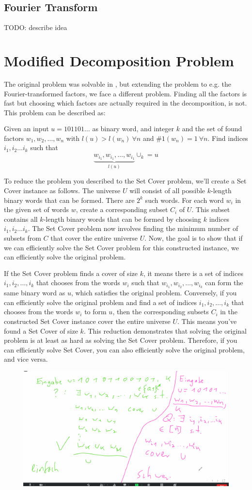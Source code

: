 \subsection{Fourier Transform}
TODO: describe idea

\section{Modified Decomposition Problem}
The original problem was solvable in \LogSpace, but extending the problem to e.g. the Fourier-transformed factors, we face a different problem. Finding all the factors is fast but choosing which factors are actually required in the decomposition, is not. This problem can be described as:

Given an input $u = 101101\dots$ as binary word, and integer $k$ and the set of found factors $w_1, w_2, \dots, w_n$ with $l(u) > l(w_n) ~\forall n$ and $\#1(w_n) = 1 ~\forall n$. Find indices $i_1, i_2 \dots i_k$ such that
\[
\underbrace{w_{i_1}, w_{i_1}, \dots, w_{i_1}}_{l(u)} \cup_k = u
\]

To reduce the problem you described to the Set Cover problem, we'll create a Set Cover instance as follows. The universe $U$ will consist of all possible $k$-length binary words that can be formed. There are $2^k$ such words.
For each word $w_i$ in the given set of words $w$, create a corresponding subset $C_i$ of $U$. This subset contains all $k$-length binary words that can be formed by choosing $k$ indices $i_1, i_2 \dots i_k$. The Set Cover problem now involves finding the minimum number of subsets from $C$ that cover the entire universe $U$. Now, the goal is to show that if we can efficiently solve the Set Cover problem for this constructed instance, we can efficiently solve the original problem.

If the Set Cover problem finds a cover of size $k$, it means there is a set of indices $i_1, i_2, \dots, i_k$ that chooses from the words $w_i$ such that $w_{i_1}, w_{i_2}, \dots, w_{i_k}$ can form the same binary word as $u$, which satisfies the original problem. Conversely, if you can efficiently solve the original problem and find a set of indices $i_1, i_2, \dots, i_k$ that chooses from the words $w_i$ to form $u$, then the corresponding subsets $C_i$ in the constructed Set Cover instance cover the entire universe $U$. This means you've found a Set Cover of size $k$. This reduction demonstrates that solving the original problem is at least as hard as solving the Set Cover problem. Therefore, if you can efficiently solve Set Cover, you can also efficiently solve the original problem, and vice versa.

\begin{figure}[h]
	\includegraphics[width=\linewidth]{proof-sketches/Screenshot[2]-01.png}
\end{figure}

